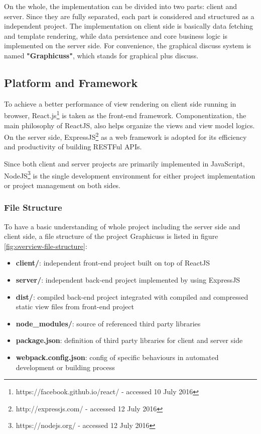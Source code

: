 On the whole, the implementation can be divided into two parts: client and server. Since they are fully separated, each part is considered and structured as a independent project. The implementation on client side is basically data fetching and template rendering, while data persistence and core business logic is implemented on the server side.  For convenience, the graphical discuss system is named \textbf{"Graphicuss"}, which stands for graphical plus discuss.


\subsection{Platform and Framework}
To achieve a better performance of view rendering on client side running in browser, React.js\footnote{https://facebook.github.io/react/ - accessed 10 July 2016} is taken as the front-end framework. Componentization, the main philosophy of ReactJS, also helps organize the views and view model logics. On the server side, ExpressJS\footnote{http://expressjs.com/ - accessed 12 July 2016} as a web framework is adopted for its efficiency and productivity of building RESTFul APIs.

Since both client and server projects are primarily implemented in JavaScript, NodeJS\footnote{https://nodejs.org/ - accessed 12 July 2016} is the single development environment for either project implementation or project management on both sides.

\subsubsection{File Structure}

To have a basic understanding of whole project including the server side and client side, a file structure of the project Graphicuss is listed in figure \ref{fig:overview-file-structure}:

\begin{itemize}
\item 
  \textbf{client/}: independent front-end project built on top of ReactJS
\item
  \textbf{server/}: independent back-end project implemented by using ExpressJS
\item
  \textbf{dist/}: compiled back-end project integrated with compiled and compressed static view files from front-end project
\item 
  \textbf{node\_modules/}: source of referenced third party libraries
\item 
  \textbf{package.json}: definition of third party libraries for client and server side
\item 
  \textbf{webpack.config.json}: config of specific behaviours in automated development or building process
\end{itemize}

